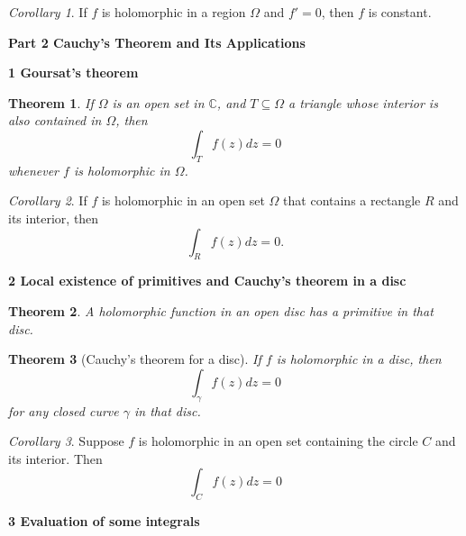 \documentclass{article}
\newtheorem{theorem}{Theorem}
\theoremstyle{definition}
\theoremstyle{remark}
\newtheorem{corollary}{Corollary}[theorem]
\begin{document}
    \begin{corollary}
        If $f$ is holomorphic in a region $\Omega$ and $f'=0$, then $f$ is constant.
    \end{corollary}

    \newpage

    \textbf{Part 2 Cauchy's Theorem and Its Applications}

    \textbf{1 Goursat's theorem}

    \begin{theorem}
        If $\Omega$ is an open set in $\mathbb{C}$, and $T\subseteq \Omega$ a triangle whose interior is also contained in $\Omega$,
        then
        \[ \int_T f(z)dz = 0 \]
        whenever $f$ is holomorphic in $\Omega$.
    \end{theorem}

    \begin{corollary}
        If $f$ is holomorphic in an open set $\Omega$ that contains a rectangle $R$ and its interior, then
        \[ \int_R f(z)dz = 0. \]
    \end{corollary}

    \textbf{2 Local existence of primitives and Cauchy's theorem in a disc}
    \begin{theorem}
        A holomorphic function in an open disc has a primitive in that disc.
    \end{theorem}

    \begin{theorem}[Cauchy's theorem for a disc]
        If $f$ is holomorphic in a disc, then
        \[ \int_{\gamma} f(z)dz = 0 \]
        for any closed curve $\gamma$ in that disc.
    \end{theorem}

    \begin{corollary}
        Suppose $f$ is holomorphic in an open set containing the circle $C$ and its interior. Then
        \[ \int_C f(z)dz = 0 \]
    \end{corollary}

    \textbf{3 Evaluation of some integrals}
    
\end{document}
